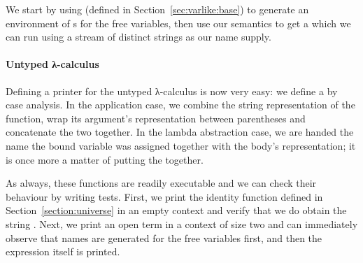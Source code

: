 We start by using  (defined in Section~\ref{sec:varlike:base})
to generate an environment of s for the free variables, then use
our semantics to get a  which we can run using a stream  of distinct
strings as our name supply.



\paragraph{Untyped λ-calculus} Defining a printer for the untyped
λ-calculus is now very easy: we define a  by case analysis.
In the application case, we combine the string representation of the
function, wrap its argument's representation between parentheses and
concatenate the two together. In the lambda abstraction case, we are
handed the name the bound variable was assigned together with the body's
representation; it is once more a matter of putting the 
together.

\begin{agdasnippet}
\end{agdasnippet}

As always, these functions are readily executable and we can check
their behaviour by writing tests. First, we print the identity function
defined in Section~\ref{section:universe}
in an empty context and verify that we do obtain the string .
Next, we print an open term in a context of size two and can immediately
observe that names are generated for the free variables first, and then the
expression itself is printed.

\begin{minipage}[t]{0.45\textwidth}
  \begin{agdasnippet}
  \end{agdasnippet}
\end{minipage}
\begin{minipage}[t]{0.45\textwidth}
  \begin{agdasnippet}
  \end{agdasnippet}
\end{minipage}
